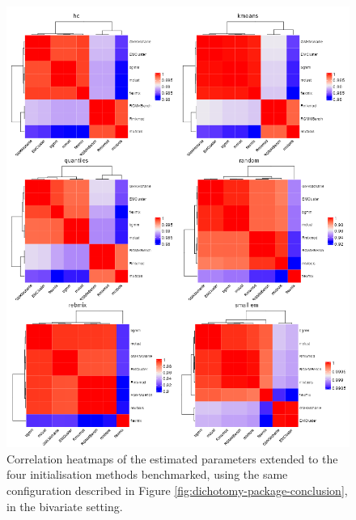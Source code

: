 \newpage
\begin{figure}

{\centering \includegraphics[width=1\linewidth]{./figs/univariate/heatmap_univariate} 

}

\caption{Correlation heatmaps of the estimated parameters extended to the four initialisation methods benchmarked, using the same configuration described in Figure \ref{fig:dichotomy-package-conclusion}, in the bivariate setting.}\label{fig:heatmap-all-correlation-plots-univariate}
\end{figure}

